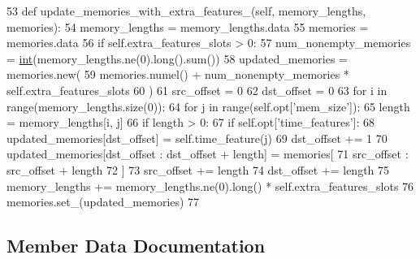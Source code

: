 \begin{DoxyCode}
53     \textcolor{keyword}{def }update\_memories\_with\_extra\_features\_(self, memory\_lengths, memories):
54         memory\_lengths = memory\_lengths.data
55         memories = memories.data
56         \textcolor{keywordflow}{if} self.extra\_features\_slots > 0:
57             num\_nonempty\_memories = \hyperlink{namespacelanguage__model_1_1eval__ppl_a7d12ee00479673c5c8d1f6d01faa272a}{int}(memory\_lengths.ne(0).long().sum())
58             updated\_memories = memories.new(
59                 memories.numel() + num\_nonempty\_memories * self.extra\_features\_slots
60             )
61             src\_offset = 0
62             dst\_offset = 0
63             \textcolor{keywordflow}{for} i \textcolor{keywordflow}{in} range(memory\_lengths.size(0)):
64                 \textcolor{keywordflow}{for} j \textcolor{keywordflow}{in} range(self.opt[\textcolor{stringliteral}{'mem\_size'}]):
65                     length = memory\_lengths[i, j]
66                     \textcolor{keywordflow}{if} length > 0:
67                         \textcolor{keywordflow}{if} self.opt[\textcolor{stringliteral}{'time\_features'}]:
68                             updated\_memories[dst\_offset] = self.time\_feature(j)
69                             dst\_offset += 1
70                         updated\_memories[dst\_offset : dst\_offset + length] = memories[
71                             src\_offset : src\_offset + length
72                         ]
73                         src\_offset += length
74                         dst\_offset += length
75             memory\_lengths += memory\_lengths.ne(0).long() * self.extra\_features\_slots
76             memories.set\_(updated\_memories)
77 
\end{DoxyCode}


\subsection{Member Data Documentation}
\mbox{\label{classparlai_1_1agents_1_1legacy__agents_1_1memnn_1_1modules__v0_1_1MemNN_a9d41205a1560d3d405b75dc20b58cbef}} 

